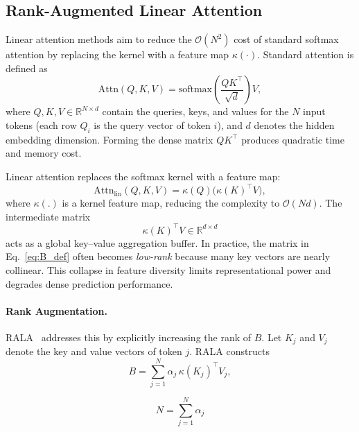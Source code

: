 \documentclass[runningheads]{llncs}
\begin{document}
\subsection{Rank-Augmented Linear Attention}
\label{subsec:rala}

Linear attention methods aim to reduce the $\mathcal{O}(N^2)$ cost of standard
softmax attention by replacing the kernel with a feature map $\kappa(\cdot)$.
Standard attention is defined as
\begin{equation}
\mathrm{Attn}(Q,K,V)=\mathrm{softmax}\!\left(\frac{QK^\top}{\sqrt{d}}\right)V,
\label{eq:softmax_attention}
\end{equation}
where $Q,K,V\in\mathbb{R}^{N\times d}$ \cite{Vaswani2017Attention} contain the
queries, keys, and values for the $N$ input tokens (each row $Q_i$ is the
query vector of token $i$), and $d$ denotes the hidden embedding dimension.
Forming the dense matrix $QK^\top$ produces quadratic time and memory cost.

Linear attention replaces the softmax kernel with a feature map:
\begin{equation}
\mathrm{Attn}_{\text{lin}}(Q,K,V)=\kappa(Q)\big(\kappa(K)^\top V\big),
\label{eq:linear_attention}
\end{equation}
where $\mathcal{\kappa(.)}$ is a kernel feature map, reducing the complexity to
$\mathcal{O}(Nd)$.
The intermediate matrix
\begin{equation}
\kappa(K)^\top V \in\mathbb{R}^{d\times d}
\label{eq:B_def}
\end{equation}
acts as a global key–value aggregation buffer. In practice, the matrix in
Eq.~\ref{eq:B_def} often becomes \emph{low-rank} because many key vectors
are nearly collinear. This collapse in feature diversity limits
representational power and degrades dense prediction performance.

\paragraph{Rank Augmentation.}
RALA~\cite{Fan2025RALA} addresses this by explicitly increasing the rank of
$B$. Let $K_j$ and $V_j$ denote the key and value vectors of token $j$.
RALA constructs
\begin{equation}
B=\sum_{j=1}^{N}\alpha_j\,\kappa(K_j)^\top V_j ,
\label{eq:rala_rank_aug}
\end{equation}

\begin{equation}
N=\sum_{j=1}^{N}\alpha_j
\label{eq:rala_alpha_aug}
\end{equation}
\end{document}
